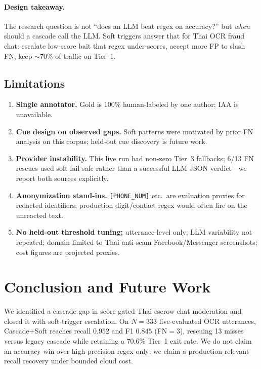 \documentclass[conference]{IEEEtran}
\begin{document}
\paragraph{Design takeaway.}
The research question is not ``does an LLM beat regex on accuracy?'' but
\emph{when} should a cascade call the LLM. Soft triggers answer that for Thai
OCR fraud chat: escalate low-score bait that regex under-scores, accept more FP
to slash FN, keep ${\sim}$70\% of traffic on Tier~1.

\subsection{Limitations}
\label{sec:limitations}
\begin{enumerate}
  \item \textbf{Single annotator.} Gold is 100\% human-labeled by one author;
        IAA is unavailable.
  \item \textbf{Cue design on observed gaps.} Soft patterns were motivated by
        prior FN analysis on this corpus; held-out cue discovery is future work.
  \item \textbf{Provider instability.} This live run had non-zero Tier~3
        fallbacks; 6/13 FN rescues used soft fail-safe rather than a successful
        LLM JSON verdict---we report both sources explicitly.
  \item \textbf{Anonymization stand-ins.} \texttt{[PHONE\_NUM]} etc.\ are
        evaluation proxies for redacted identifiers; production digit/contact
        regex would often fire on the unreacted text.
  \item \textbf{No held-out threshold tuning;} utterance-level only;
        LLM variability not repeated; domain limited to Thai anti-scam
        Facebook/Messenger screenshots; cost figures are projected proxies.
\end{enumerate}

\section{Conclusion and Future Work}

We identified a cascade gap in score-gated Thai escrow chat moderation and
closed it with soft-trigger escalation. On $N{=}333$ live-evaluated OCR
utterances, Cascade+Soft reaches recall $0.952$ and F1 $0.845$ (FN$=3$),
rescuing 13 misses versus legacy cascade while retaining a 70.6\% Tier~1 exit
rate. We do not claim an accuracy win over high-precision regex-only; we claim
a production-relevant recall recovery under bounded cloud cost.
\end{document}
